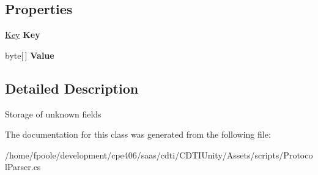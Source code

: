 \subsection*{Properties}
\begin{DoxyCompactItemize}
\item 
\hypertarget{class_silent_orbit_1_1_protocol_buffers_1_1_key_value_a041f3d9740a6df457ea3c74d2b024b7f}{}\hyperlink{class_silent_orbit_1_1_protocol_buffers_1_1_key}{Key} {\bfseries Key}\label{class_silent_orbit_1_1_protocol_buffers_1_1_key_value_a041f3d9740a6df457ea3c74d2b024b7f}

\item 
\hypertarget{class_silent_orbit_1_1_protocol_buffers_1_1_key_value_a358b40d160e891e8cdd9039d86469f60}{}byte\mbox{[}$\,$\mbox{]} {\bfseries Value}\label{class_silent_orbit_1_1_protocol_buffers_1_1_key_value_a358b40d160e891e8cdd9039d86469f60}

\end{DoxyCompactItemize}


\subsection{Detailed Description}
Storage of unknown fields 



The documentation for this class was generated from the following file\+:\begin{DoxyCompactItemize}
\item 
/home/fpoole/development/cpe406/saas/cdti/\+C\+D\+T\+I\+Unity/\+Assets/scripts/Protocol\+Parser.\+cs\end{DoxyCompactItemize}

